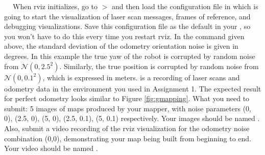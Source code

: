 \documentclass[a4paper,10pt]{article}
\begin{document}
   $\;$  $\;$  
\newline
\newline
\noindent When rviz initializes, go to  $>$  and then load the configuration file in 
which is going to start the visualization of laser scan messages, frames of reference, and debugging visualizations. Save this configuration file as the default
in your , so you won't have to do this every time you restart rviz. In the  command given above, the standard deviation of 
the odometry orientation noise is given in degrees. In this example the true yaw of the robot is corrupted by random noise from $\mathcal{N}(0, 2.5^2)$. Similarly, the true position 
is corrupted by random noise from $\mathcal{N}(0, 0.1^2)$, which is expressed in meters.  is a recording of laser scans and odometry data in the environment 
you used in Assignment 1. The expected result for perfect odometry looks similar to Figure \ref{fig:gmapping}. 
\newline
\newline
\newline
\noindent What you need to submit: 5 images of maps produced by your mapper, with noise parameters (0, 0), (2.5, 0), (5, 0), (2.5, 0.1), (5, 0.1) respectively. 
Your images should be named . Also, submit a video recording of the rviz visualization for the odometry noise combination (0,0),
demonstrating your map being built from beginning to end. Your video should be named . 
\end{document}
